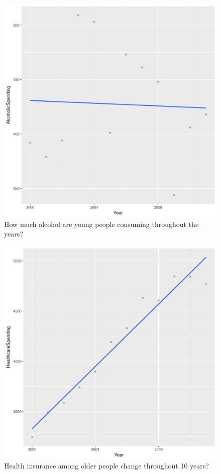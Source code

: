 \documentclass[11pt]{article}
\begin{document}
\begin{figure}[h]
\caption{How much alcohol are young people consuming throughout the years?}
\centering
\includegraphics[widt=\textwidth]{quest1.png}
\end{figure}

\begin{figure}[h]
\caption{Health insurance among older people change throughout 10 years?}
\centering
\includegraphics[widt=\textwidth]{quest2.png}
\end{figure}
\end{document}
